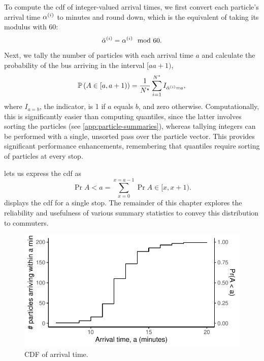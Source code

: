 To compute the \gls{cdf} of integer-valued arrival times, we first convert each particle's arrival time $\alpha^{(i)}$ to minutes and round down, which is the equivalent of taking its modulus with 60:
\begin{equation}
\label{eq:particle_eta_modulus}
\breve{\alpha}^{(i)} = \alpha^{(i)} \mod 60.
\end{equation}
Next, we tally the number of particles with each arrival time $a$ and calculate the probability of the bus arriving in the interval $[a a+1)$,
\begin{equation}
\label{eq:pf_pdf_arrivaltime}
\mathbb{P}\left(A \in [a, a+1)\right) =
\frac{1}{N^\star} \sum_{i=1}^{N^\star} I_{\breve{\alpha}^{(i)} = a},
\end{equation}
where $I_{a=b}$, the indicator, is 1 if $a$ equals $b$, and zero otherwise. Computationally, this is significantly easier than computing quantiles, since the latter involves sorting the particles (see \cref{app:particle-summaries}), whereas tallying integers can be performed with a single, unsorted pass over the particle vector. This provides significant performance enhancements, remembering that quantiles require sorting of particles at every stop.


 lets us express the \gls{cdf} as
\begin{equation}
\label{eq:pf_cdf_arrivaltime}
\Pr{A < a} = \sum_{x=0}^{x=a-1} \Pr{A \in [x, x+1)}.
\end{equation}
 displays the \gls{cdf} for a single stop. The remainder of this chapter explores the reliability and usefulness of various summary statistics to convey this distribution to commuters.

\begin{knitrout}\small
{}\color{fgcolor}\begin{figure}

{\centering \includegraphics[width=.6\textwidth]{figure/eta_cdf-1} 

}

\caption[CDF of arrival time]{CDF of arrival time.}\label{fig:eta_cdf}
\end{figure}


\end{knitrout}





